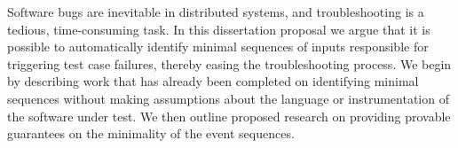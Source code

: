 Software bugs are inevitable in distributed systems,
and troubleshooting is a tedious, time-consuming task.
In this dissertation proposal we argue that it is possible to
automatically identify minimal sequences of inputs
responsible for triggering
test case failures, thereby easing the troubleshooting process.
We begin by describing work that has already been completed on
identifying minimal sequences without making assumptions about the
language or instrumentation of the software under test.
We then outline proposed research on providing provable guarantees on
the minimality of the event sequences.
